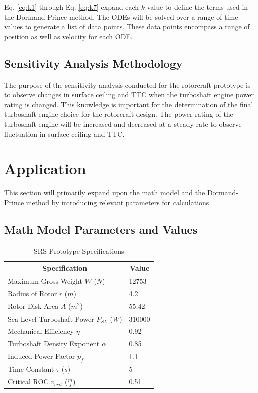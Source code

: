 \documentclass[12pt]{report}
\begin{document}
\noindent Eq. \ref{eq:k1} through Eq. \ref{eq:k7} expand each $k$ value to define the terms used in the Dormand-Prince method. The ODEs
will be solved over a range of time values to generate a list of data points. These data points encompass a range of position as
well as velocity for each ODE.

\section{Sensitivity Analysis Methodology}

The purpose of the sensitivity analysis conducted for the rotorcraft prototype is to observe changes in surface ceiling and TTC 
when the turboshaft engine power rating is changed. This knowledge is important for the determination of the final turboshaft
engine choice for the rotorcraft design. The power rating of the turboshaft engine will be increased and decreased at a steady rate to observe fluctuation in surface
ceiling and TTC.

\chapter{Application} 

This section will primarily expand upon the math model and the Dormand-Prince method by introducing relevant parameters for calculations.

\section{Math Model Parameters and Values}

\begin{table}
\caption{SRS Prototype Specifications}
\label{table:heli}
\centering
\renewcommand{\arraystretch}{1.25}
\begin{tabular}{l l} %
\hline\hline
\multicolumn{1}{c}{Specification} &
\multicolumn{1}{c}{Value} \\ %
\hline
Maximum Gross Weight $W$ ($N$) & 12753 \\
Radius of Rotor $r$ ($m$) & 4.2  \\
Rotor Disk Area $A$ ($m^2$) & 55.42 \\
Sea Level Turboshaft Power $P_{SL}$ ($W$) & 310000 \\
Mechanical Efficiency $\eta$ & 0.92  \\
Turboshaft Density Exponent $\alpha$ & 0.85  \\
Induced Power Factor $p_f$ & 1.1 \\
Time Constant $\tau$ ($s$) & 5 \\
Critical ROC $v_{crit}$ ($\frac{m}{s}$) & 0.51 \\
\hline\hline
\end{tabular}
\normalsize
\end{table}
\end{document}
